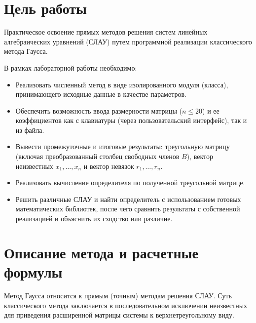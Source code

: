 \documentclass[a4paper,12pt]{article}
\begin{document}
\setcounter{page}{2}

\newpage

\tableofcontents

\newpage
\section{Цель работы}
Практическое освоение прямых методов решения систем линейных алгебраических уравнений (СЛАУ) путем программной реализации классического метода Гаусса. 

В рамках лабораторной работы необходимо:
\begin{itemize}
    \item Реализовать численный метод в виде изолированного модуля (класса), принимающего исходные данные в качестве параметров.
    \item Обеспечить возможность ввода размерности матрицы ($n \le 20$) и ее коэффициентов как с клавиатуры (через пользовательский интерфейс), так и из файла.
    \item Вывести промежуточные и итоговые результаты: треугольную матрицу (включая преобразованный столбец свободных членов $B$), вектор неизвестных $x_1, \dots, x_n$ и вектор невязок $r_1, \dots, r_n$.
    \item Реализовать вычисление определителя по полученной треугольной матрице.
    \item Решить различные СЛАУ и найти определитель с использованием готовых математических библиотек, после чего сравнить результаты с собственной реализацией и объяснить их сходство или различие.
\end{itemize}

\newpage
\section{Описание метода и расчетные формулы}

Метод Гаусса относится к прямым (точным) методам решения СЛАУ. Суть классического метода заключается в последовательном исключении неизвестных для приведения расширенной матрицы системы к верхнетреугольному виду.
\end{document}

